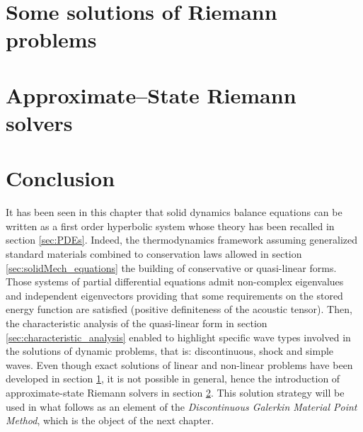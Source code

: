 \section{Some solutions of Riemann problems}
\label{sec:riemann_problems}

\section{Approximate--State Riemann solvers}
\label{sec:riemann_solvers}


\section*{Conclusion}
It has been seen in this chapter that solid dynamics balance equations can be written as a first order hyperbolic system whose theory has been recalled in section \ref{sec:PDEs}. Indeed, the thermodynamics framework assuming generalized standard materials combined to conservation laws allowed in section \ref{sec:solidMech_equations} the building of conservative or quasi-linear forms. Those systems of partial differential equations admit non-complex eigenvalues and independent eigenvectors providing that some requirements on the stored energy function are satisfied (positive definiteness of the acoustic tensor). Then, the characteristic analysis of the quasi-linear form in section \ref{sec:characteristic_analysis} enabled to highlight specific wave types involved in the solutions of dynamic problems, that is: discontinuous, shock and simple waves. Even though exact solutions of linear and non-linear problems have been developed in section \ref{sec:riemann_problems}, it is not possible in general, hence the introduction of approximate-state Riemann solvers in section \ref{sec:riemann_solvers}. This solution strategy will be used in what follows as an element of the \textit{Discontinuous Galerkin Material Point Method}, which is the object of the next chapter.

